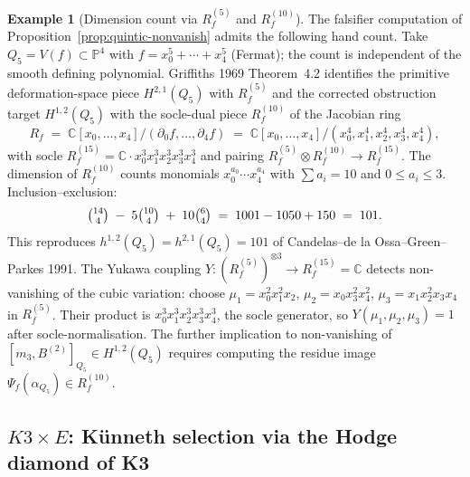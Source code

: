 \documentclass[11pt,reqno]{amsart}
\theoremstyle{plain}
\theoremstyle{definition}
\newtheorem{example}[theorem]{Example}
\theoremstyle{remark}
\newcommand{\Cbb}{\mathbb{C}}
\newcommand{\Pbb}{\mathbb{P}}
\begin{document}
\begin{example}[Dimension count via $R_f^{(5)}$ and $R_f^{(10)}$]
\label{ex:hand-quintic}
The falsifier computation of Proposition~\ref{prop:quintic-nonvanish} admits the following hand count. Take $Q_5 = V(f) \subset \Pbb^4$ with $f = x_0^5 + \cdots + x_4^5$ (Fermat); the count is independent of the smooth defining polynomial. Griffiths 1969 Theorem~4.2 identifies the primitive deformation-space piece $H^{2,1}(Q_5)$ with $R_f^{(5)}$ and the corrected obstruction target $H^{1,2}(Q_5)$ with the socle-dual piece $R_f^{(10)}$ of the Jacobian ring
\[
  R_f \;=\; \Cbb[x_0, \ldots, x_4] \big/ (\partial_0 f, \ldots, \partial_4 f) \;=\; \Cbb[x_0, \ldots, x_4] \big/ (x_0^4, x_1^4, x_2^4, x_3^4, x_4^4),
\]
with socle $R_f^{(15)} = \Cbb \cdot x_0^3 x_1^3 x_2^3 x_3^3 x_4^3$ and pairing $R_f^{(5)}\otimes R_f^{(10)}\to R_f^{(15)}$. The dimension of $R_f^{(10)}$ counts monomials $x_0^{a_0} \cdots x_4^{a_4}$ with $\sum a_i = 10$ and $0 \leq a_i \leq 3$. Inclusion--exclusion:
\[
  \tbinom{14}{4} \;-\; 5\tbinom{10}{4} \;+\; 10\tbinom{6}{4} \;=\; 1001 - 1050 + 150 \;=\; 101.
\]
This reproduces $h^{1,2}(Q_5)=h^{2,1}(Q_5)=101$ of Candelas--de la Ossa--Green--Parkes 1991. The Yukawa coupling $Y : (R_f^{(5)})^{\otimes 3} \to R_f^{(15)} = \Cbb$ detects non-vanishing of the cubic variation: choose $\mu_1 = x_0^2 x_1^2 x_2$, $\mu_2 = x_0 x_3^2 x_4^2$, $\mu_3 = x_1 x_2^2 x_3 x_4$ in $R_f^{(5)}$. Their product is $x_0^3 x_1^3 x_2^3 x_3^3 x_4^3$, the socle generator, so $Y(\mu_1, \mu_2, \mu_3) = 1$ after socle-normalisation. The further implication to non-vanishing of $[m_3,B^{(2)}]_{Q_5}\in H^{1,2}(Q_5)$ requires computing the residue image $\Psi_f(\alpha_{Q_5})\in R_f^{(10)}$.
\end{example}

\subsection{$K3 \times E$: K\"unneth selection via the Hodge diamond of K3}
\label{sub:hand-k3e}
\end{document}
